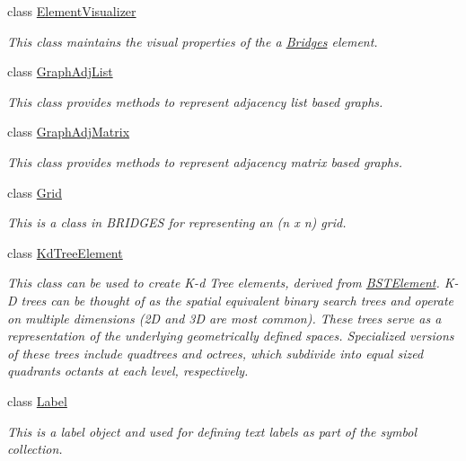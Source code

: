 \begin{DoxyCompactItemize}
class \hyperlink{classbridges_1_1datastructure_1_1_element_visualizer}{Element\+Visualizer}
\begin{DoxyCompactList}\small\item\em This class maintains the visual properties of the a \hyperlink{classbridges_1_1_bridges}{Bridges} element. \end{DoxyCompactList}\item 
class \hyperlink{classbridges_1_1datastructure_1_1_graph_adj_list}{Graph\+Adj\+List}
\begin{DoxyCompactList}\small\item\em This class provides methods to represent adjacency list based graphs. \end{DoxyCompactList}\item 
class \hyperlink{classbridges_1_1datastructure_1_1_graph_adj_matrix}{Graph\+Adj\+Matrix}
\begin{DoxyCompactList}\small\item\em This class provides methods to represent adjacency matrix based graphs. \end{DoxyCompactList}\item 
class \hyperlink{classbridges_1_1datastructure_1_1_grid}{Grid}
\begin{DoxyCompactList}\small\item\em This is a class in B\+R\+I\+D\+G\+ES for representing an (n x n) grid. \end{DoxyCompactList}\item 
class \hyperlink{classbridges_1_1datastructure_1_1_kd_tree_element}{Kd\+Tree\+Element}
\begin{DoxyCompactList}\small\item\em This class can be used to create K-\/d Tree elements, derived from \hyperlink{classbridges_1_1datastructure_1_1_b_s_t_element}{B\+S\+T\+Element}. K-\/D trees can be thought of as the spatial equivalent binary search trees and operate on multiple dimensions (2D and 3D are most common). These trees serve as a representation of the underlying geometrically defined spaces. Specialized versions of these trees include quadtrees and octrees, which subdivide into equal sized quadrants octants at each level, respectively. \end{DoxyCompactList}\item 
class \hyperlink{classbridges_1_1datastructure_1_1_label}{Label}
\begin{DoxyCompactList}\small\item\em This is a label object and used for defining text labels as part of the symbol collection. \end{DoxyCompactList}\item 

\end{DoxyCompactItemize}
